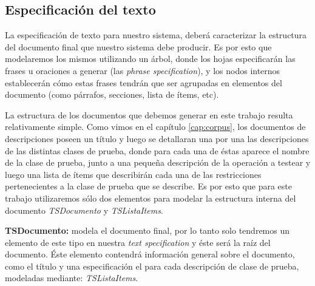 \subsection{Especificación del texto}



La especificación de texto para nuestro sistema, deberá caracterizar la estructura del documento final que nuestro sistema debe producir. Es por esto que modelaremos los mismos utilizando un árbol, donde los hojas especificarán las frases u oraciones a generar (las \emph{phrase specification}), y los nodos internos establecerán cómo estas frases tendrán que ser agrupadas en elementos del documento (como párrafos, secciones, lista de ítems, etc). 

La estructura de los documentos que debemos generar en este trabajo resulta relativamente simple. Como vimos en el capítulo \ref{cap:corpus}, los documentos de descripciones poseen un título y luego se detallaran una por una las descripciones de las distintas clases de prueba, donde para cada una de éstas aparece el nombre de la clase de prueba, junto a una pequeña descripción de la operación a testear y luego una lista de ítems que describirán cada una de las restricciones pertenecientes a la clase de prueba que se describe. Es por esto que para este trabajo utilizaremos sólo dos elementos para modelar la estructura interna del documento \emph{TSDocumento} y \emph{TSListaItems}.

\medskip
\noindent
\textbf{TSDocumento:} modela el documento final, por lo tanto solo tendremos un elemento de este tipo en nuestra \emph{text specification} y éste será la raíz del documento. Éste elemento contendrá información general sobre el documento, como el título y una especificación el para cada descripción de clase de prueba, modeladas mediante: \emph{TSListaItems}.

